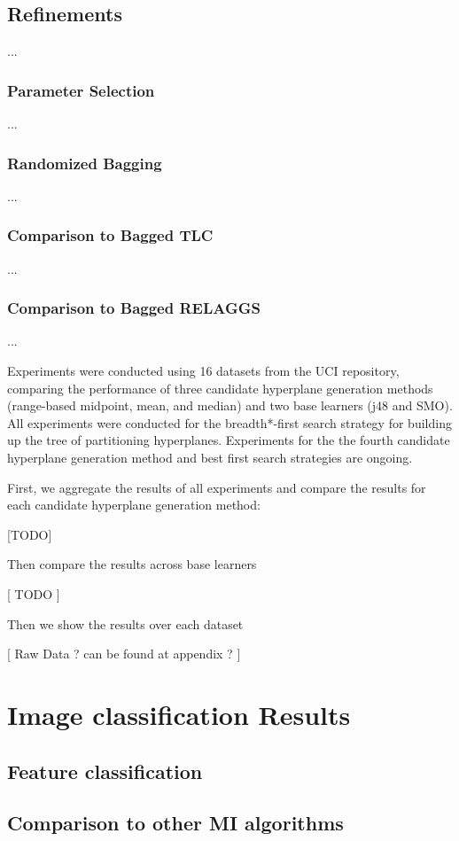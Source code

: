 \documentclass[a4paper,12pt]{report} %
\begin{document}
\section{Refinements}
...
\subsection{Parameter Selection}
...
\subsection{Randomized Bagging}
...
\subsection{Comparison to Bagged TLC}
...
\subsection{Comparison to Bagged RELAGGS}
...

Experiments were conducted using 16 datasets from the UCI repository, 
    comparing the performance of three candidate hyperplane generation methods 
    (range-based midpoint, mean, and median)
    and two base learners (j48 and SMO).
All experiments were conducted for the breadth*-first search strategy for 
    building up the tree of partitioning hyperplanes.
Experiments for the the fourth candidate hyperplane generation method and best first search strategies 
    are ongoing.
    
First, we aggregate the results of all experiments and 
    compare the results for each candidate hyperplane generation method:
    
[TODO]

Then compare the results across base learners 

[ TODO ]

Then we show the results over each dataset

[ Raw Data ? can be found at appendix ? ]    
    
\chapter{Image classification Results}
\section{Feature classification}
\section{Comparison to other MI algorithms}
\end{document}
